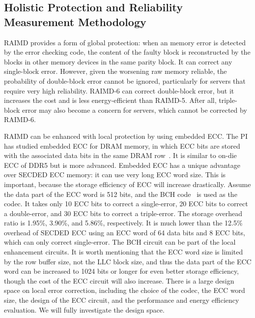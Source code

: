 \documentclass[11pt]{article}
\begin{document}
\subsection{Holistic Protection and Reliability Measurement Methodology}
\label{sec:holistic}

RAIMD provides a form of global protection: when an memory error is detected by
the error checking code, the content of the faulty block is reconstructed by the
blocks in other memory devices in the same parity block.  It can correct any
single-block error.  However, given the worsening raw memory reliable, the
probability of double-block error cannot be ignored, particularly for servers
that require very high reliability.  RAIMD-6 can correct double-block error, but
it increases the cost and is less energy-efficient than RAIMD-5.  After all,
triple-block error may also become a concern for servers, which cannot be
corrected by RAIMD-6.

RAIMD can be enhanced with local protection by using embedded ECC.  The PI has
studied embedded ECC for DRAM memory, in which ECC bits are stored with the
associated data bits in the same DRAM row~\cite{Chen:taco13}.  It is similar to
on-die ECC of DDR5 but is more advanced.  Embedded ECC has a unique advantage
over SECDED ECC memory: it can use very long ECC word size.  This is important,
because the storage efficiency of ECC will increase drastically.  Assume the
data part of the ECC word is 512 bits, and the BCH code~\cite{} is used as the
codec.  It takes only 10 ECC bits to correct a single-error, 20 ECC bits to
correct a double-error, and 30 ECC bits to correct a triple-error.  The storage
overhead ratio is 1.95\%, 3.90\%, and 5.86\%, respectively.  It is much lower
than the 12.5\% overhead of SECDED ECC using an ECC word of 64 data bits and 8
ECC bits, which can only correct single-error.  The BCH circuit can be part of
the local enhancement circuits.  It is worth mentioning that the ECC word size
is limited by the row buffer size, not the LLC block size, and thus the data
part of the ECC word can be increased to 1024 bits or longer for even better
storage efficiency, though the cost of the ECC circuit will also increase.
There is a large design space on local error correction, including the choice of
the codec, the ECC word size, the design of the ECC circuit, and the performance
and energy efficiency evaluation.  We will fully investigate the design space.
\end{document}

